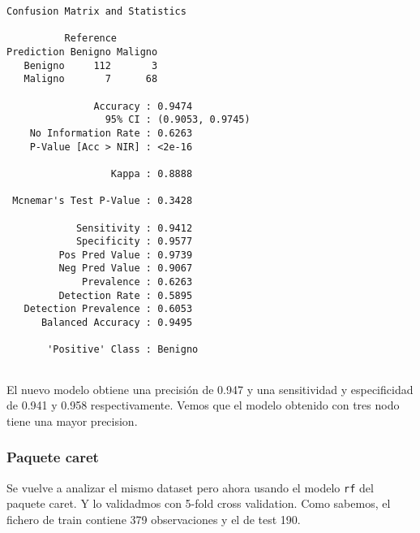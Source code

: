 \documentclass[
]{article}
\begin{document}
\begin{verbatim}
Confusion Matrix and Statistics

          Reference
Prediction Benigno Maligno
   Benigno     112       3
   Maligno       7      68
                                          
               Accuracy : 0.9474          
                 95% CI : (0.9053, 0.9745)
    No Information Rate : 0.6263          
    P-Value [Acc > NIR] : <2e-16          
                                          
                  Kappa : 0.8888          
                                          
 Mcnemar's Test P-Value : 0.3428          
                                          
            Sensitivity : 0.9412          
            Specificity : 0.9577          
         Pos Pred Value : 0.9739          
         Neg Pred Value : 0.9067          
             Prevalence : 0.6263          
         Detection Rate : 0.5895          
   Detection Prevalence : 0.6053          
      Balanced Accuracy : 0.9495          
                                          
       'Positive' Class : Benigno         
                                          
\end{verbatim}

El nuevo modelo obtiene una precisión de 0.947 y una sensitividad y
especificidad de 0.941 y 0.958 respectivamente. Vemos que el modelo
obtenido con tres nodo tiene una mayor precision.

\hypertarget{paquete-caret-2}{%
\subsubsection{Paquete caret}\label{paquete-caret-2}}

Se vuelve a analizar el mismo dataset pero ahora usando el modelo
\texttt{rf} del paquete caret. Y lo validadmos con 5-fold cross
validation. Como sabemos, el fichero de train contiene 379 observaciones
y el de test 190.
\end{document}

